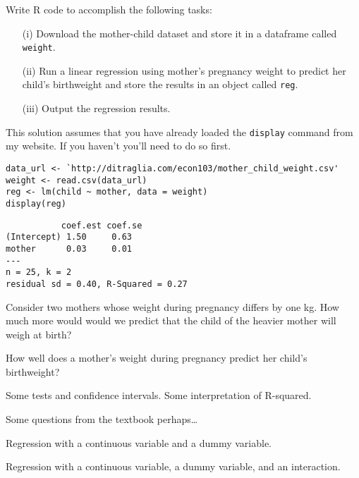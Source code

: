 \documentclass[addpoints,12pt]{exam}
\begin{document}
\begin{questions}

\question Write R code to accomplish the following tasks: 
\begin{enumerate} 
  \item[(i)] Download the mother-child dataset and store it in a dataframe called \texttt{weight}.
  \item[(ii)] Run a linear regression using mother's pregnancy weight to predict her child's birthweight and store the results in an object called \texttt{reg}.
  \item[(iii)] Output the regression results. 
\end{enumerate}
\begin{solution}
  This solution assumes that you have already loaded the \texttt{display} command from my website. If you haven't you'll need to do so first.
\begin{verbatim}
data_url <- `http://ditraglia.com/econ103/mother_child_weight.csv'
weight <- read.csv(data_url)
reg <- lm(child ~ mother, data = weight)
display(reg)
\end{verbatim}
\end{solution}

\begin{verbatim}
           coef.est coef.se
(Intercept) 1.50     0.63   
mother      0.03     0.01   
---
n = 25, k = 2
residual sd = 0.40, R-Squared = 0.27
\end{verbatim}

\question Consider two mothers whose weight during pregnancy differs by one kg.
How much more would would we predict that the child of the heavier mother will weigh at birth? 

\question How well does a mother's weight during pregnancy predict her child's birthweight? 

\question Some tests and confidence intervals. Some interpretation of R-squared.



\question Some questions from the textbook perhaps\dots
 

\question Regression with a continuous variable and a dummy variable.

\question Regression with a continuous variable, a dummy variable, and an interaction.

\end{questions}
\end{document}
